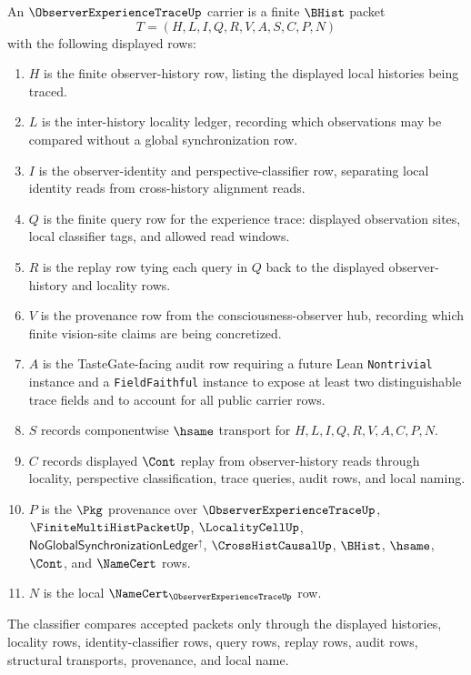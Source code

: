 \begin{definition}
\label{def:observer-experience-trace-carrier}
An $\ObserverExperienceTraceUp$ carrier is a finite $\BHist$ packet
$$
T=(H,L,I,Q,R,V,A,S,C,P,N)
$$
with the following displayed rows:
\begin{enumerate}
\item $H$ is the finite observer-history row, listing the displayed local histories being traced.
\item $L$ is the inter-history locality ledger, recording which observations may be compared without a global synchronization row.
\item $I$ is the observer-identity and perspective-classifier row, separating local identity reads from cross-history alignment reads.
\item $Q$ is the finite query row for the experience trace: displayed observation sites, local classifier tags, and allowed read windows.
\item $R$ is the replay row tying each query in $Q$ back to the displayed observer-history and locality rows.
\item $V$ is the provenance row from the consciousness-observer hub, recording which finite vision-site claims are being concretized.
\item $A$ is the TasteGate-facing audit row requiring a future Lean \texttt{Nontrivial} instance and a \texttt{FieldFaithful} instance to expose at least two distinguishable trace fields and to account for all public carrier rows.
\item $S$ records componentwise $\hsame$ transport for $H,L,I,Q,R,V,A,C,P,N$.
\item $C$ records displayed $\Cont$ replay from observer-history reads through locality, perspective classification, trace queries, audit rows, and local naming.
\item $P$ is the $\Pkg$ provenance over $\ObserverExperienceTraceUp$, $\FiniteMultiHistPacketUp$, $\LocalityCellUp$, $\mathsf{NoGlobalSynchronizationLedger}^{\uparrow}$, $\CrossHistCausalUp$, $\BHist$, $\hsame$, $\Cont$, and $\NameCert$ rows.
\item $N$ is the local $\NameCert_{\ObserverExperienceTraceUp}$ row.
\end{enumerate}
The classifier compares accepted packets only through the displayed histories, locality rows, identity-classifier rows, query rows, replay rows, audit rows, structural transports, provenance, and local name.
\end{definition}

